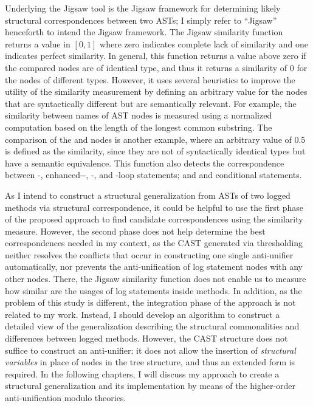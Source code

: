 Underlying the Jigsaw tool is the Jigsaw framework for determining likely structural correspondences between two ASTs; I simply refer to ``Jigsaw'' henceforth to intend the Jigsaw framework.
The Jigsaw similarity function returns a value in $[0, 1]$ where zero indicates complete lack of similarity and one indicates perfect similarity. In general, this function returns a value above zero if the compared nodes are of identical type, and thus it returns a similarity of 0 for the nodes of different types. However, it uses several heuristics to improve the utility of the similarity measurement by defining an arbitrary value for the nodes that are syntactically different but are semantically relevant. For example, the similarity between names of AST nodes is measured using a normalized computation based on the length of the longest common substring. The comparison of the  and  nodes is another example, where an arbitrary value of 0.5 is defined as the similarity, since they are not of syntactically identical types but have a semantic equivalence. This function also detects the correspondence between -, enhanced--, -, and -loop statements; and  and  conditional statements.


As I intend to construct a structural generalization from ASTs of two logged methods via structural correspondence, it could be helpful to use the first phase of the proposed approach to find candidate correspondences using the similarity measure. However, the second phase does not help determine the best correspondences needed in my context, as the CAST generated via thresholding neither resolves the conflicts that occur in constructing one single anti-unifier automatically, nor prevents the anti-unification of log statement nodes with any other nodes. There, the Jigsaw similarity function does not enable us to measure how similar are the usages of log statements inside methods. In addition, as the problem of this study is different, the integration phase of the approach is not related to my work. Instead, I should develop an algorithm to construct a detailed view of the generalization describing the structural commonalities and differences between logged methods. However, the CAST structure does not suffice to construct an anti-unifier: it does not allow the insertion of \emph{structural variables} in place of nodes in the tree structure, and thus an extended form is required. In the following chapters, I will discuss my approach to create a structural generalization and its implementation by means of the higher-order anti-unification modulo theories.

